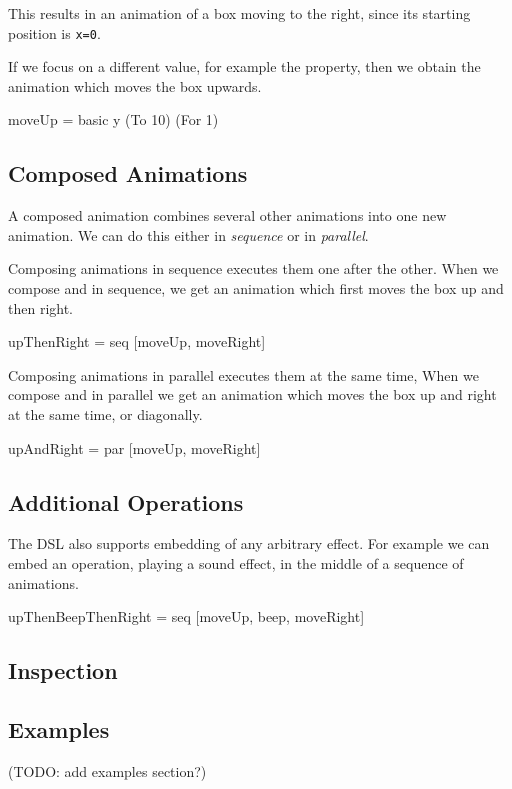 This results in an animation of a box moving to the right, since its starting position is \texttt{x=0}.

If we focus on a different value, for example the  property, then we obtain the animation which moves the box upwards.
\begin{code}
moveUp = basic y (To 10) (For 1)
\end{code}

\subsection{Composed Animations}

A composed animation combines several other animations into one new animation. We can do this either in \emph{sequence} or in \emph{parallel}.

Composing animations in sequence executes them one after the other. When we compose  and  in sequence, we get an animation which first moves the box up and then right.
\begin{code}
upThenRight = seq [moveUp, moveRight]
\end{code}

Composing animations in parallel executes them at the same time, When we compose  and  in parallel we get an animation which moves the box up and right at the same time, or diagonally.
\begin{code}
upAndRight = par [moveUp, moveRight]
\end{code}

\subsection{Additional Operations}


The DSL also supports embedding of any arbitrary effect. For example we can embed an  operation, playing a sound effect, in the middle of a sequence of animations.
\begin{code}
upThenBeepThenRight = seq [moveUp, beep, moveRight]
\end{code}


\subsection{Inspection}


\subsection{Examples}

(TODO: add examples section?)

